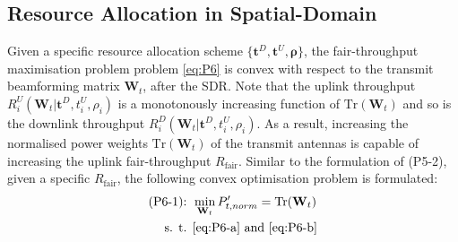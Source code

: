 \documentclass[12pt,draft,onecolumn,journal]{IEEEtran}
\begin{document}
\subsection{Resource Allocation in Spatial-Domain}

Given a specific resource allocation scheme $\{\mathbf{t}^{D}, \mathbf{t}^{U}, \boldsymbol{\rho}\}$, the fair-throughput maximisation problem problem \eqref{eq:P6} is convex with respect to the transmit beamforming matrix $\mathbf{W}_t$, after the SDR.  Note that the uplink throughput $R_i^U(\mathbf{W}_t | \mathbf{t}^D,t_i^U,\rho_i)$ is a monotonously increasing function of $\text{Tr}(\mathbf{W}_t)$ and so is the downlink throughput $R_i^D(\mathbf{W}_t | \mathbf{t}^D,t_i^U,\rho_i)$. As a result, increasing the normalised power weights $\text{Tr}(\mathbf{W}_t)$ of the transmit antennas is capable of increasing the uplink fair-throughput $R_{\text{fair}}$. Similar to the formulation of (P5-2), given a specific $R_{\text{fair}}$, the following convex optimisation problem is formulated:
\begin{align}
	\text{(P6-1): } &\min_{\mathbf{W}_t} P_{t,norm}' = \text{Tr}(\mathbf{W}_t) \label{eq:P6-1} \\
	\text{s. t. } & \text{\eqref{eq:P6-a} and \eqref{eq:P6-b}} \nonumber
\end{align}
\end{document}
